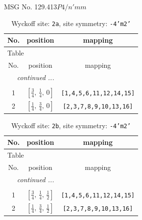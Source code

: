 \documentclass[fleqn,8pt]{jsarticle}
\begin{document}
\setcounter{MaxMatrixCols}{32}

\renewcommand{\tablename}{Table~}
\renewcommand{\figurename}{Figure~}
\begin{center}
\LARGE
MSG No. 129.413\quad$P4/n'mm$
\end{center}
\renewcommand{\arraystretch}{1.2}
\begin{longtable}{ccc}
\caption{Wyckoff site: {\tt 2a}, site symmetry: {\tt -4'm2'}}
 \\
 \hline \hline
No. & position & mapping \\ \hline \endfirsthead

\multicolumn{2}{l}{\tablename\ \thetable{}} \\
 \hline \hline
No. & position & mapping \\ \hline \endhead

 \hline \hline
\multicolumn{2}{r}{\footnotesize\it continued ...} \\ \endfoot

 \hline \hline
\multicolumn{2}{r}{} \\ \endlastfoot

1 & $\left[ \frac{3}{4},\, \frac{1}{4},\, 0 \right]$ & {\tt [1,4,5,6,11,12,14,15]} \\ \hline
2 & $\left[ \frac{1}{4},\, \frac{3}{4},\, 0 \right]$ & {\tt [2,3,7,8,9,10,13,16]} \\
\end{longtable}
\renewcommand{\arraystretch}{1.2}
\begin{longtable}{ccc}
\caption{Wyckoff site: {\tt 2b}, site symmetry: {\tt -4'm2'}}
 \\
 \hline \hline
No. & position & mapping \\ \hline \endfirsthead

\multicolumn{2}{l}{\tablename\ \thetable{}} \\
 \hline \hline
No. & position & mapping \\ \hline \endhead

 \hline \hline
\multicolumn{2}{r}{\footnotesize\it continued ...} \\ \endfoot

 \hline \hline
\multicolumn{2}{r}{} \\ \endlastfoot

1 & $\left[ \frac{3}{4},\, \frac{1}{4},\, \frac{1}{2} \right]$ & {\tt [1,4,5,6,11,12,14,15]} \\ \hline
2 & $\left[ \frac{1}{4},\, \frac{3}{4},\, \frac{1}{2} \right]$ & {\tt [2,3,7,8,9,10,13,16]} \\
\end{longtable}
\end{document}
